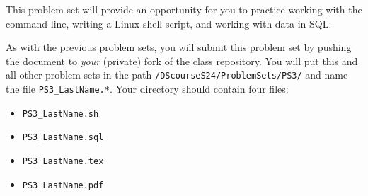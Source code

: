 \documentclass[12pt,english]{exam}
\begin{document}
This problem set will provide an opportunity for you to practice working with the command line, writing a Linux shell script, and working with data in SQL.

As with the previous problem sets, you will submit this problem set by pushing the document to \emph{your} (private) fork of the class repository. You will put this and all other problem sets in the path \texttt{/DScourseS24/ProblemSets/PS3/} and name the file \texttt{PS3\_LastName.*}. Your directory should contain four files:
\begin{itemize}
    \item \texttt{PS3\_LastName.sh}
    \item \texttt{PS3\_LastName.sql}
    \item \texttt{PS3\_LastName.tex}
    \item \texttt{PS3\_LastName.pdf}
\end{itemize}
\end{document}
